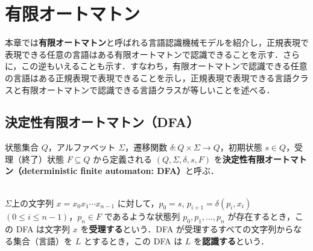 \documentclass[main]{subfiles}
\begin{document}
\setcounter{chapter}{2} %
\setcounter{page}{9} %
\chapter{有限オートマトン}

本章では\textbf{有限オートマトン}と呼ばれる言語認識機械モデルを紹介し，正規表現で表現できる任意の言語はある有限オートマトンで認識できることを示す．さらに，この逆もいえることも示す．すなわち，有限オートマトンで認識できる任意の言語はある正規表現で表現できることを示し，正規表現で表現できる言語クラスと有限オートマトンで認識できる言語クラスが等しいことを述べる．

\section{決定性有限オートマトン（DFA）}

\begin{mdframed}[
    linewidth=1pt,
    linecolor=black,
    backgroundcolor=white,
    shadow=true,
    shadowsize=4pt,
    shadowcolor=black
]
\noindent 状態集合 $Q$，アルファベット $\Sigma$，遷移関数 $\delta : Q \times \Sigma \rightarrow Q$，初期状態 $s \in Q$，受理（終了）状態 $F \subseteq Q$ から定義される $(Q,\Sigma,\delta,s,F)$ を\textbf{決定性有限オートマトン（deterministic finite automaton: DFA）}と呼ぶ．
\end{mdframed}

\ \\
$\Sigma$上の文字列 $x = x_0 x_1 \cdots x_{n-1}$ に対して，$p_0 = s$, $p_{i+1} = \delta(p_i,x_i)$ $(0 \leq i \leq n - 1)$，$p_n \in F$ であるような状態列 $p_0, p_1, \ldots, p_n$ が存在するとき，この DFA は文字列 $x$ を\textbf{受理する}という．DFA が受理するすべての文字列からなる集合（言語）を $L$ とするとき，この DFA は $L$ を\textbf{認識する}という．
\end{document}
